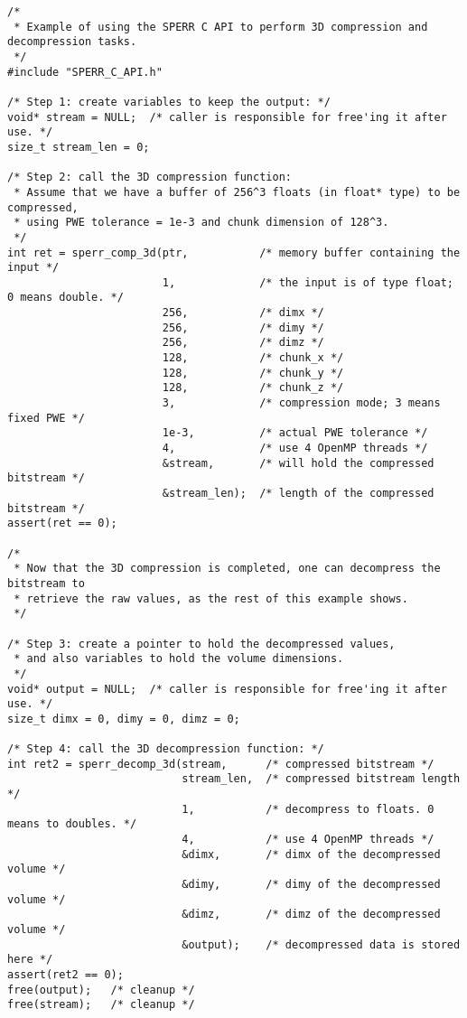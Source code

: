 \documentclass{article}
\begin{document}
\begin{verbatim}
/*
 * Example of using the SPERR C API to perform 3D compression and decompression tasks.
 */
#include "SPERR_C_API.h"

/* Step 1: create variables to keep the output: */
void* stream = NULL;  /* caller is responsible for free'ing it after use. */
size_t stream_len = 0;

/* Step 2: call the 3D compression function:
 * Assume that we have a buffer of 256^3 floats (in float* type) to be compressed,
 * using PWE tolerance = 1e-3 and chunk dimension of 128^3.
 */
int ret = sperr_comp_3d(ptr,           /* memory buffer containing the input */
                        1,             /* the input is of type float; 0 means double. */
                        256,           /* dimx */
                        256,           /* dimy */
                        256,           /* dimz */
                        128,           /* chunk_x */
                        128,           /* chunk_y */
                        128,           /* chunk_z */
                        3,             /* compression mode; 3 means fixed PWE */
                        1e-3,          /* actual PWE tolerance */
                        4,             /* use 4 OpenMP threads */
                        &stream,       /* will hold the compressed bitstream */
                        &stream_len);  /* length of the compressed bitstream */
assert(ret == 0);

/* 
 * Now that the 3D compression is completed, one can decompress the bitstream to
 * retrieve the raw values, as the rest of this example shows.
 */

/* Step 3: create a pointer to hold the decompressed values,
 * and also variables to hold the volume dimensions.
 */
void* output = NULL;  /* caller is responsible for free'ing it after use. */
size_t dimx = 0, dimy = 0, dimz = 0;

/* Step 4: call the 3D decompression function: */
int ret2 = sperr_decomp_3d(stream,      /* compressed bitstream */
                           stream_len,  /* compressed bitstream length */
                           1,           /* decompress to floats. 0 means to doubles. */
                           4,           /* use 4 OpenMP threads */
                           &dimx,       /* dimx of the decompressed volume */
                           &dimy,       /* dimy of the decompressed volume */
                           &dimz,       /* dimz of the decompressed volume */
                           &output);    /* decompressed data is stored here */
assert(ret2 == 0);
free(output);   /* cleanup */
free(stream);   /* cleanup */
\end{verbatim}
\end{document}

